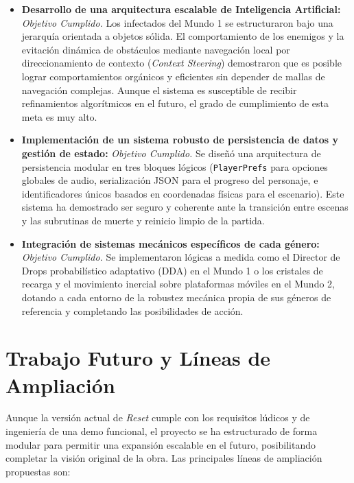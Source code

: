 \begin{itemize}
    \item \textbf{Desarrollo de una arquitectura escalable de Inteligencia Artificial:} \textit{Objetivo Cumplido.} Los infectados del Mundo 1 se estructuraron bajo una jerarquía orientada a objetos sólida. El comportamiento de los enemigos y la evitación dinámica de obstáculos mediante navegación local por direccionamiento de contexto (\textit{Context Steering}) demostraron que es posible lograr comportamientos orgánicos y eficientes sin depender de mallas de navegación complejas. Aunque el sistema es susceptible de recibir refinamientos algorítmicos en el futuro, el grado de cumplimiento de esta meta es muy alto.
    
    \item \textbf{Implementación de un sistema robusto de persistencia de datos y gestión de estado:} \textit{Objetivo Cumplido.} Se diseñó una arquitectura de persistencia modular en tres bloques lógicos (\texttt{PlayerPrefs} para opciones globales de audio, serialización JSON para el progreso del personaje, e identificadores únicos basados en coordenadas físicas para el escenario). Este sistema ha demostrado ser seguro y coherente ante la transición entre escenas y las subrutinas de muerte y reinicio limpio de la partida.
    
    \item \textbf{Integración de sistemas mecánicos específicos de cada género:} \textit{Objetivo Cumplido.} Se implementaron lógicas a medida como el Director de Drops probabilístico adaptativo (DDA) en el Mundo 1 o los cristales de recarga y el movimiento inercial sobre plataformas móviles en el Mundo 2, dotando a cada entorno de la robustez mecánica propia de sus géneros de referencia y completando las posibilidades de acción.
\end{itemize}

\section{Trabajo Futuro y Líneas de Ampliación}
\label{sec:trabajo_futuro}
Aunque la versión actual de \textit{Reset} cumple con los requisitos lúdicos y de ingeniería de una demo funcional, el proyecto se ha estructurado de forma modular para permitir una expansión escalable en el futuro, posibilitando completar la visión original de la obra. Las principales líneas de ampliación propuestas son:

